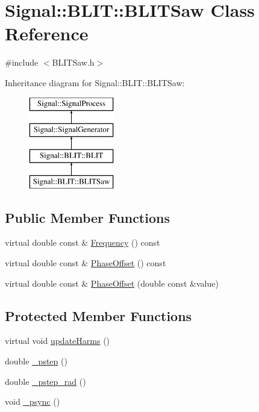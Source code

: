 \hypertarget{classSignal_1_1BLIT_1_1BLITSaw}{\section{Signal\+:\+:B\+L\+I\+T\+:\+:B\+L\+I\+T\+Saw Class Reference}
\label{classSignal_1_1BLIT_1_1BLITSaw}
}


{\ttfamily \#include $<$B\+L\+I\+T\+Saw.\+h$>$}

Inheritance diagram for Signal\+:\+:B\+L\+I\+T\+:\+:B\+L\+I\+T\+Saw\+:\begin{figure}[H]
\begin{center}
\leavevmode
\includegraphics[height=4.000000cm]{classSignal_1_1BLIT_1_1BLITSaw}
\end{center}
\end{figure}
\subsection*{Public Member Functions}
\begin{DoxyCompactItemize}
\item 
virtual double const \& \hyperlink{classSignal_1_1SignalGenerator_a96af42ee68f94e9b04d034fd68b73ecd}{Frequency} () const 
\item 
virtual double const \& \hyperlink{classSignal_1_1SignalGenerator_ac2538ec946f001e394d2416fda698d1c}{Phase\+Offset} () const 
\item 
virtual double const \& \hyperlink{classSignal_1_1SignalGenerator_ac6a103ff72beaa338f6d18c812522d78}{Phase\+Offset} (double const \&value)
\end{DoxyCompactItemize}
\subsection*{Protected Member Functions}
\begin{DoxyCompactItemize}
\item 
virtual void \hyperlink{classSignal_1_1BLIT_1_1BLITSaw_a9c8ad70fca571cc707eaa99649d74afc}{update\+Harms} ()
\item 
double \hyperlink{classSignal_1_1BLIT_1_1BLIT_ae552ae6350f291dd14198f88fbda0359}{\+\_\+pstep} ()
\item 
double \hyperlink{classSignal_1_1BLIT_1_1BLIT_a09820c226748516af14ff25043f1c51a}{\+\_\+pstep\+\_\+rad} ()
\item 
void \hyperlink{classSignal_1_1BLIT_1_1BLIT_ad0ede061ea6ca1db803d16ac8c968875}{\+\_\+psync} ()
\end{DoxyCompactItemize}

